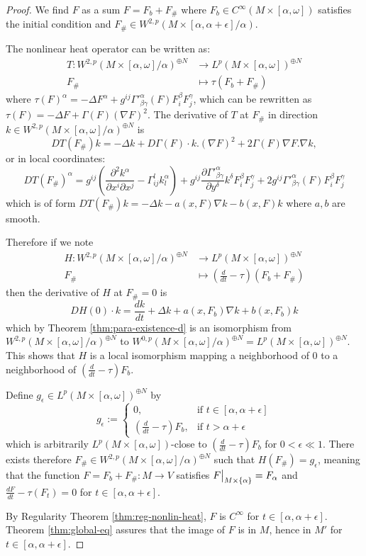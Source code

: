 \begin{proof}
We find \(F\) as a sum \(F = F_b + F_\#\) where \(F_b\in C^\infty(M\times
[\alpha,\omega])\) satisfies the initial condition and \(F_\# \in W^{2,p}(M\times
[\alpha,\alpha+\epsilon]/\alpha)\).

The nonlinear heat operator can be written as:
\begin{align*}
  T: W^{2,p}(M\times[\alpha,\omega]/\alpha)^{\oplus N} &\longrightarrow L^p(M\times[\alpha,\omega])^{\oplus N}\\
  	F_\#					       &\longmapsto \tau(F_b + F_\#)
\end{align*} 
where \(\tau(F)^\alpha = - \Delta F^\alpha + g^{ij}\Gamma'^\alpha_{\beta\gamma}(F)
F^\beta_i F^\gamma_j\), which can be rewritten as \(\tau(F) = -\Delta F +
\Gamma(F)(\nabla F)^2\). The derivative of \(T\) at \(F_\#\) in direction \(k\in
W^{2,p}(M\times[\alpha,\omega]/\alpha)^{\oplus N}\) is
\[
 DT(F_\#) k = -\Delta k +D \Gamma(F)\cdot k . (\nabla F)^2 + 2\Gamma(F) \nabla F. \nabla k,
\]
or in local coordinates:
\[
  DT(F_\#)^\alpha = g^{ij}\left( \frac{\partial^2 k^\alpha}{\partial x^i \partial x^j} -
\Gamma^l_{ij} k^\alpha_l \right) + g^{ij} \frac{\partial \Gamma'^\alpha_{\beta\gamma}}{\partial y^\delta} k^\delta F^\beta_i F^\gamma_j + 2g^{ij} \Gamma'^\alpha_{\beta\gamma}(F) F^\beta_i F^\gamma_j 
\]
which is of form \(DT(F_\#) k = -\Delta k - a(x,F) \nabla k -b(x,F) k\) where \(a,b\)
are smooth.

Therefore if we note  
\begin{align*}
  H: W^{2,p}(M\times[\alpha,\omega]/\alpha)^{\oplus N} &\longrightarrow L^p(M\times[\alpha,\omega])^{\oplus N}\\
  	F_\#					       &\longmapsto (\frac{d }{dt} - \tau)(F_b + F_\#)
\end{align*}
then the derivative of \(H\) at \(F_\# = 0\) is
\[
 DH(0)\cdot k = \frac{d k}{d t} + \Delta k + a(x, F_b) \nabla k + b(x, F_b) k
\]
which by Theorem \ref{thm:para-existence-d} is an isomorphism from \(W^{2,p}(M\times[\alpha,\omega]/\alpha)^{\oplus N}\) to
\(W^{0,p}(M\times[\alpha,\omega]/\alpha)^{\oplus N} =  L^p(M\times[\alpha,\omega])^{\oplus
N}\). This shows that \(H\) is a local isomorphism mapping a neighborhood of \(0\) to
a neighborhood of \((\frac{d }{dt}-\tau)F_b\).

Define \(g_\epsilon\in L^p(M\times [\alpha,\omega])^{\oplus N}\) by 
\[
 g_\epsilon:= \begin{cases}
0	      ,  & \text{if $t\in[\alpha,\alpha+\epsilon]$} \\
(\frac{d }{dt}-\tau)F_b	      , & \text{if $t > \alpha+\epsilon$}
	      \end{cases}
\]
which is arbitrarily \(L^p(M\times[\alpha,\omega])\)-close to \((\frac{d }{dt}-\tau)F_b\) for \(0<\epsilon \ll 1\). There exists therefore \(F_\#\in W^{2,p}(M\times
[\alpha,\omega]/\alpha)^{\oplus N}\) such that \(H(F_\#) = g_\epsilon\), meaning that
the function \(F= F_b + F_\#: M \longrightarrow V\) satisfies \(\restr{F}{M\times\{\alpha\}} = F_\alpha\)
and \(\frac{d F}{d t} -\tau(F_t) = 0\) for \(t\in[\alpha,\alpha+\epsilon]\).

By Regularity Theorem \ref{thm:reg-nonlin-heat}, \(F\) is \(C^\infty\) for \(t\in[\alpha,\alpha+\epsilon]\). Theorem \ref{thm:global-eq} assures that the image of \(F\) is in \(M\), hence in \(M'\) for \(t\in [\alpha,\alpha+\epsilon]\).
\end{proof}

